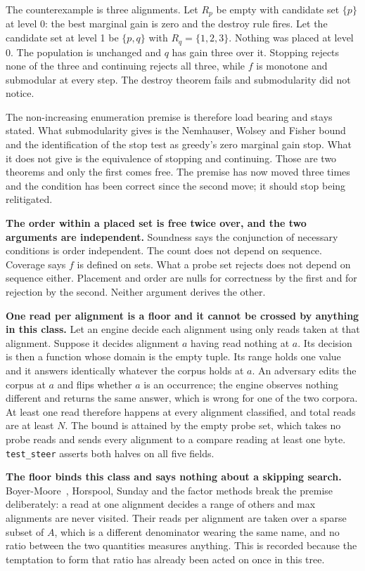 The counterexample is three alignments. Let \(R_p\) be empty with candidate set \(\{p\}\) at level 0: the best marginal gain is zero and the destroy rule fires. Let the candidate set at level 1 be \(\{p, q\}\) with \(R_q = \{1,2,3\}\). Nothing was placed at level 0. The population is unchanged and \(q\) has gain three over it. Stopping rejects none of the three and continuing rejects all three, while \(f\) is monotone and submodular at every step. The destroy theorem fails and submodularity did not notice.

The non-increasing enumeration premise is therefore load bearing and stays stated. What submodularity gives is the Nemhauser, Wolsey and Fisher bound and the identification of the stop test as greedy's zero marginal gain stop. What it does not give is the equivalence of stopping and continuing. Those are two theorems and only the first comes free. The premise has now moved three times and the condition has been correct since the second move; it should stop being relitigated.

\textbf{The order within a placed set is free twice over, and the two arguments are independent.} Soundness says the conjunction of necessary conditions is order independent. The count does not depend on sequence. Coverage says \(f\) is defined on sets. What a probe set rejects does not depend on sequence either. Placement and order are nulls for correctness by the first and for rejection by the second. Neither argument derives the other.

\textbf{One read per alignment is a floor and it cannot be crossed by anything in this class.} Let an engine decide each alignment using only reads taken at that alignment. Suppose it decides alignment \(a\) having read nothing at \(a\). Its decision is then a function whose domain is the empty tuple. Its range holds one value and it answers identically whatever the corpus holds at \(a\). An adversary edits the corpus at \(a\) and flips whether \(a\) is an occurrence; the engine observes nothing different and returns the same answer, which is wrong for one of the two corpora. At least one read therefore happens at every alignment classified, and total reads are at least \(N\). The bound is attained by the empty probe set, which takes no probe reads and sends every alignment to a compare reading at least one byte. \texttt{test\_steer} asserts both halves on all five fields.

\textbf{The floor binds this class and says nothing about a skipping search.} Boyer-Moore~\cite{src:Boyer-and-Moore-1977}, Horspool, Sunday and the factor methods break the premise deliberately: a read at one alignment decides a range of others and max alignments are never visited. Their reads per alignment are taken over a sparse subset of \(A\), which is a different denominator wearing the same name, and no ratio between the two quantities measures anything. This is recorded because the temptation to form that ratio has already been acted on once in this tree.

